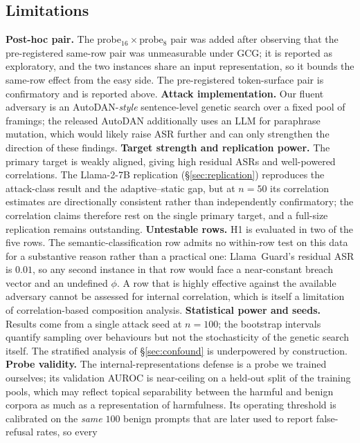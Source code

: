 \subsection{Limitations}
\label{sec:limits-corr}
\textbf{Post-hoc pair.} The probe$_{16}\times$probe$_{8}$ pair was added after observing that
the pre-registered same-row pair was unmeasurable under GCG; it is reported as exploratory,
and the two instances share an input representation, so it bounds the same-row effect from
the easy side. The pre-registered token-surface pair is confirmatory and is reported above.
\textbf{Attack implementation.} Our fluent adversary is an AutoDAN-\emph{style} sentence-level
genetic search over a fixed pool of framings; the released AutoDAN additionally uses an LLM
for paraphrase mutation, which would likely raise ASR further and can only strengthen the
direction of these findings.
\textbf{Target strength and replication power.} The primary target is weakly aligned, giving
high residual ASRs and well-powered correlations. The Llama-2-7B replication
(\S\ref{sec:replication}) reproduces the attack-class result and the adaptive--static gap,
but at $n=50$ its correlation estimates are directionally consistent rather than
independently confirmatory; the correlation claims therefore rest on the single primary
target, and a full-size replication remains outstanding.
\textbf{Untestable rows.} H1 is evaluated in two of the five rows. The semantic-classification
row admits no within-row test on this data for a substantive reason rather than a practical
one: Llama~Guard's residual ASR is $0.01$, so any second instance in that row would face a
near-constant breach vector and an undefined $\phi$. A row that is highly effective against
the available adversary cannot be assessed for internal correlation, which is itself a
limitation of correlation-based composition analysis.
\textbf{Statistical power and seeds.} Results come from a single attack seed at $n=100$; the
bootstrap intervals quantify sampling over behaviours but not the stochasticity of the
genetic search itself. The stratified analysis of \S\ref{sec:confound} is underpowered by
construction.
\textbf{Probe validity.} The internal-representations defense is a probe we trained
ourselves; its validation AUROC is near-ceiling on a held-out split of the training pools,
which may reflect topical separability between the harmful and benign corpora as much as a
representation of harmfulness. Its operating threshold is calibrated on the
\emph{same} $100$ benign prompts that are later used to report false-refusal rates, so every
